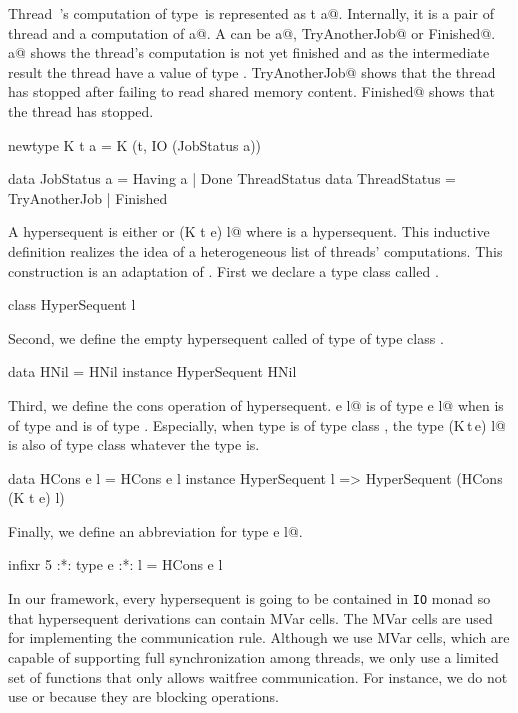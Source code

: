 Thread~\verb@t@'s computation of type~\verb@a@ is represented as \verb@K t a@.
Internally, it is a pair of thread and a computation of \verb@JobStatus a@.
A \verb@JobStatus@ can be \verb@Having a@,
\verb@Done TryAnotherJob@ or \verb@Done Finished@.
\verb@Having a@ shows the thread's computation is not yet finished and
as the intermediate result the thread have a value of type \verb@a@.
\verb@Done TryAnotherJob@ shows that the thread has stopped after
failing to read shared memory content.
\verb@Done Finished@ shows that the thread has stopped.
\begin{code}
newtype K t a = K (t, IO (JobStatus a))

data JobStatus a = Having a | Done ThreadStatus
data ThreadStatus = TryAnotherJob | Finished
\end{code}

A hypersequent is either \verb@HNil@ or \verb@HCons (K t e) l@ where \verb@l@ is a
hypersequent.  This inductive definition realizes the idea of a
heterogeneous list of threads' computations.  This construction is an
adaptation of \citep{hetero}.
First we declare a type class called \verb@HyperSequent@.
\begin{code}
class HyperSequent l
\end{code}
Second, we define the empty hypersequent called \verb@HNil@ of type
\verb@HNil@ of type class \verb@HyperSequent@.
\begin{code}
data HNil = HNil
instance HyperSequent HNil
\end{code}
Third, we define the cons operation of hypersequent.
\verb@HCons e l@ is of type \verb@HCons e l@ when \verb@e@ is of type
\verb@e@ and \verb@l@ is of type \verb@l@.  Especially, when type
\verb@l@ is of type class \verb@HyperSequent@, the type \verb@HCons (K\,t\,e) l@
is also of type class \verb@HyperSequent@ whatever the type \verb@e@ is.
\begin{code}
data HCons e l = HCons e l
instance HyperSequent l =>
  HyperSequent (HCons (K t e) l)
\end{code}
Finally, we define an abbreviation for type \verb@HCons e l@.
\begin{code}
infixr 5 :*:
type e :*: l = HCons e l
\end{code}
In our framework, every hypersequent is going to be contained in
\texttt{IO} monad
so that hypersequent derivations can contain MVar
cells. The MVar cells are used for implementing the communication
rule. Although we use MVar cells, which are capable of supporting full
synchronization among threads, we only use a limited set of functions
that only allows waitfree communication. For instance, we do not use
\verb@takeMVar@ or \verb@putMVar@ because they are blocking operations.

